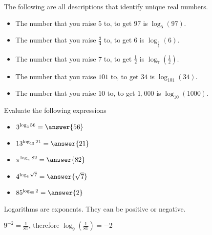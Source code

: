 \documentclass{ximera}
\begin{document}
\begin{example}
The following are all descriptions that identify unique real numbers.

\begin{itemize}
\item The number that you raise $5$ to, to get $97$ is $\log_5(97)$. \\
\item The number that you raise $\frac{3}{4}$ to, to get $6$ is $\log_{\tfrac{3}{4}}(6)$. \\
\item The number that you raise $7$ to, to get $\frac{1}{2}$ is $\log_7\left(\frac{1}{2}\right)$. \\
\item The number that you raise $101$ to, to get $34$ is $\log_{101}(34)$. \\
\item The number that you raise $10$ to, to get $1,000$ is $\log_{10}(1000)$. \\
\end{itemize}

\end{example}



\begin{example}
Evaluate the following expressions

\begin{itemize}
\item  $3^{\log_3{56}} = \answer{56}$
\item  $13^{\log_{13}{21}} = \answer{21}$
\item  $\pi^{\log_{\pi}{82}} = \answer{82}$
\item  $4^{\log_4{\sqrt{7}}} = \answer{\sqrt{7}}$
\item  $85^{\log_{85}{2}} = \answer{2}$

\end{itemize}

\end{example}












Logarithms are exponents.  They can be positive or negative.



$9^{-2} = \frac{1}{81}$, therefore  $\log_{9}\left(\frac{1}{81}\right) = -2$
\end{document}
